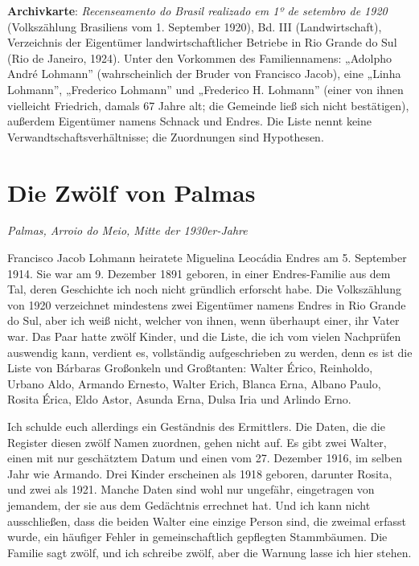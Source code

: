 \documentclass[
  ngerman,
  11pt,
  openany]{book}
\begin{document}
\begin{ficha}

\textbf{Archivkarte}: \emph{Recenseamento do Brasil realizado em 1º de
setembro de 1920} (Volkszählung Brasiliens vom 1. September 1920), Bd.
III (Landwirtschaft), Verzeichnis der Eigentümer landwirtschaftlicher
Betriebe in Rio Grande do Sul (Rio de Janeiro, 1924). Unter den
Vorkommen des Familiennamens: „Adolpho André Lohmann'' (wahrscheinlich
der Bruder von Francisco Jacob), eine „Linha Lohmann'', „Frederico
Lohmann'' und „Frederico H. Lohmann'' (einer von ihnen vielleicht
Friedrich, damals 67 Jahre alt; die Gemeinde ließ sich nicht
bestätigen), außerdem Eigentümer namens Schnack und Endres. Die Liste
nennt keine Verwandtschaftsverhältnisse; die Zuordnungen sind
Hypothesen.

\end{ficha}

\section{Die Zwölf von Palmas}\label{die-zwuxf6lf-von-palmas}

\emph{Palmas, Arroio do Meio, Mitte der 1930er-Jahre}

Francisco Jacob Lohmann heiratete Miguelina Leocádia Endres am 5.
September 1914. Sie war am 9. Dezember 1891 geboren, in einer
Endres-Familie aus dem Tal, deren Geschichte ich noch nicht gründlich
erforscht habe. Die Volkszählung von 1920 verzeichnet mindestens zwei
Eigentümer namens Endres in Rio Grande do Sul, aber ich weiß nicht,
welcher von ihnen, wenn überhaupt einer, ihr Vater war. Das Paar hatte
zwölf Kinder, und die Liste, die ich vom vielen Nachprüfen auswendig
kann, verdient es, vollständig aufgeschrieben zu werden, denn es ist die
Liste von Bárbaras Großonkeln und Großtanten: Walter Érico, Reinholdo,
Urbano Aldo, Armando Ernesto, Walter Erich, Blanca Erna, Albano Paulo,
Rosita Érica, Eldo Astor, Asunda Erna, Dulsa Iria und Arlindo Erno.

Ich schulde euch allerdings ein Geständnis des Ermittlers. Die Daten,
die die Register diesen zwölf Namen zuordnen, gehen nicht auf. Es gibt
zwei Walter, einen mit nur geschätztem Datum und einen vom 27. Dezember
1916, im selben Jahr wie Armando. Drei Kinder erscheinen als 1918
geboren, darunter Rosita, und zwei als 1921. Manche Daten sind wohl nur
ungefähr, eingetragen von jemandem, der sie aus dem Gedächtnis errechnet
hat. Und ich kann nicht ausschließen, dass die beiden Walter eine
einzige Person sind, die zweimal erfasst wurde, ein häufiger Fehler in
gemeinschaftlich gepflegten Stammbäumen. Die Familie sagt zwölf, und ich
schreibe zwölf, aber die Warnung lasse ich hier stehen.
\end{document}
